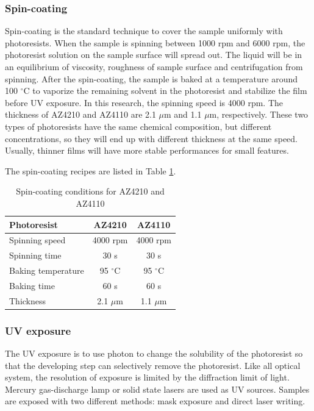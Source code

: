 \documentclass[pdflatex, sectionletters, 12pt, final, phd]{pittetd}    %
\begin{document}
\subsubsection{Spin-coating}

 Spin-coating is the standard technique to cover the sample uniformly with photoresists. When the sample is spinning between 1000 rpm and 6000 rpm, the photoresist solution on the sample surface will spread out. The liquid will be in an equilibrium of viscosity, roughness of sample surface and centrifugation from spinning. After the spin-coating, the sample is baked at a temperature around 100 $^{\circ}$C to vaporize the remaining solvent in the photoresist and stabilize the film before UV exposure. In this research, the spinning speed is 4000 rpm. The thickness of AZ4210 and AZ4110 are 2.1 $\mu$m and 1.1 $\mu$m, respectively. These two types of photoresists have the same chemical composition, but different concentrations, so they will end up with different thickness at the same speed. Usually, thinner films will have more stable performances for small features.

The spin-coating recipes are listed in Table \ref{TAB:photoresistsCoating}.

\begin{table}
	\centering
	\begin{tabular}{l|cc}
		\hline
		Photoresist    &    AZ4210    &    AZ4110 \\ \hline
		Spinning speed    &    4000 rpm    & 4000 rpm    \\ 
		Spinning time    &    30 s    &    30 s    \\
		Baking temperature    &    95 $^{\circ}$C    &    95 $^{\circ}$C \\ 
		Baking time    &    60 s    &    60 s    \\
		Thickness    &    2.1 $\mu$m    &    1.1 $\mu$m \\ \hline
	\end{tabular}
	\caption{Spin-coating conditions for AZ4210 and AZ4110}
	\label{TAB:photoresistsCoating}
	
\end{table}

\subsubsection{UV exposure}

The UV exposure is to use photon to change the solubility of the photoresist so that the developing step can selectively remove the photoresist. Like all optical system, the resolution of exposure is limited by the diffraction limit of light. Mercury gas-discharge lamp or solid state lasers are used as UV sources. Samples are exposed with two different methods: mask exposure and direct laser writing. 
\end{document}
